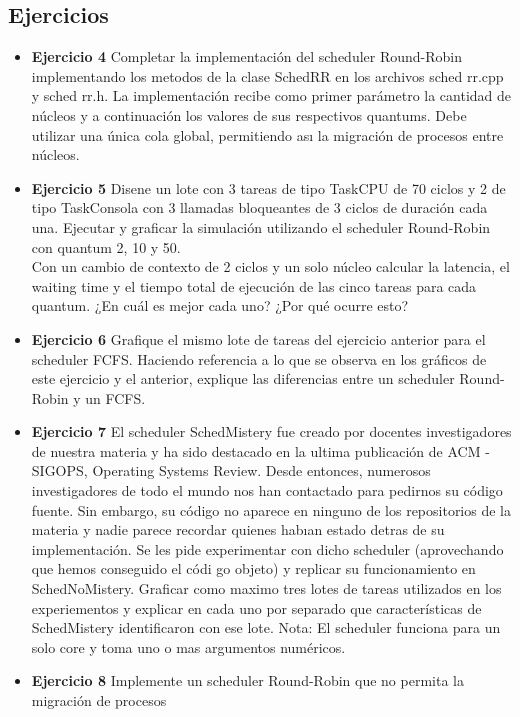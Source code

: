 
\subsection{Ejercicios}
\begin{itemize}
 \item 
\textbf{Ejercicio 4}  Completar la implementación del scheduler Round-Robin implementando los
metodos de la clase SchedRR en los archivos sched rr.cpp y sched rr.h. La implementaci\'{o}n
recibe como primer par\'{a}metro la cantidad de n\'{u}cleos y a continuaci\'{o}n los valores de sus
respectivos quantums. Debe utilizar una \'{u}nica cola global, permitiendo ası la migraci\'{o}n de
procesos entre n\'{u}cleos.
\item \textbf{Ejercicio 5} Disene un lote con 3 tareas de tipo TaskCPU de 70 ciclos y 2 de tipo TaskConsola
con 3 llamadas bloqueantes de 3 ciclos de duraci\'{o}n cada una. Ejecutar y graficar la simulaci\'{o}n
utilizando el scheduler Round-Robin con quantum 2, 10 y 50.\\
Con un cambio de contexto de 2 ciclos y un solo n\'{u}cleo calcular la latencia, el waiting
time y el tiempo total de ejecuci\'{o}n de las cinco tareas para cada quantum. 
¿En cu\'{a}l es mejor cada uno? ¿Por qu\'{e} ocurre esto?
\item \textbf{Ejercicio 6} Grafique el mismo lote de tareas del ejercicio anterior para el scheduler FCFS.
Haciendo referencia a lo que se observa en los gr\'{a}ficos de este ejercicio y el anterior, explique
las diferencias entre un scheduler Round-Robin y un FCFS.
\item \textbf{Ejercicio 7} El scheduler SchedMistery fue creado por docentes investigadores de nuestra
materia y ha sido destacado en la ultima publicaci\'{o}n de ACM - SIGOPS, Operating Systems
Review. Desde entonces, numerosos investigadores de todo el mundo nos han contactado para
pedirnos su c\'{o}digo fuente. Sin embargo, su c\'{o}digo no aparece en ninguno de los repositorios
de la materia y nadie parece recordar quienes habıan estado detras de su implementaci\'{o}n.
Se les pide experimentar con dicho scheduler (aprovechando que hemos conseguido el c\'{o}di
go objeto) y replicar su funcionamiento en SchedNoMistery. Graficar como maximo tres lotes
de tareas utilizados en los experiementos y explicar en cada uno por separado que caracter\'{i}sticas
de SchedMistery identificaron con ese lote. Nota: El scheduler funciona para un solo
core y toma uno o mas argumentos num\'{e}ricos.
\item \textbf{Ejercicio 8} Implemente un scheduler Round-Robin que no permita la migraci\'{o}n de procesos

\end{itemize}
